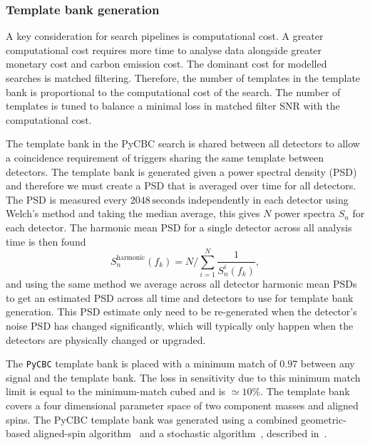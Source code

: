 \subsubsection{Template bank generation}

A key consideration for \gwadj search pipelines is computational cost. A greater computational cost requires more time to analyse \gwadj data alongside greater monetary cost and carbon emission cost. The dominant cost for modelled searches is matched filtering. Therefore, the number of templates in the template bank is proportional to the computational cost of the search. The number of templates is tuned to balance a minimal loss in matched filter SNR with the computational cost.

The template bank in the PyCBC search is shared between all detectors to allow a coincidence requirement of triggers sharing the same template between detectors. The template bank is generated given a power spectral density (PSD) and therefore we must create a PSD that is averaged over time for all detectors. The PSD is measured every $2048 \, \text{seconds}$ independently in each detector using Welch's method and taking the median average, this gives $N$ power spectra $S_{n}$ for each detector. The harmonic mean PSD for a single detector across all analysis time is then found
%
\begin{equation}
    S_{n}^{\text{harmonic}}(f_{k}) = N / \sum^{N}_{i = 1} \frac{1}{S^{i}_{n}(f_{k})},
\end{equation}
%
and using the same method we average across all detector harmonic mean PSDs to get an estimated PSD across all time and detectors to use for template bank generation. This PSD estimate only need to be re-generated when the detector's noise PSD has changed significantly, which will typically only happen when the detectors are physically changed or upgraded.

The \texttt{PyCBC} template bank is placed with a minimum match of $0.97$ between any signal and the template bank. The loss in sensitivity due to this minimum match limit is equal to the minimum-match cubed and is ${\simeq}10\%$. The template bank covers a four dimensional parameter space of two component masses and aligned spins. The PyCBC template bank was generated using a combined geometric-based aligned-spin algorithm~\cite{Harry_Lundgren:2012, Harry_precession:2013} and a stochastic algorithm~\cite{Ajith:2012, Privitera:2013}, described in~\cite{pycbc_template_bank:2016}.

